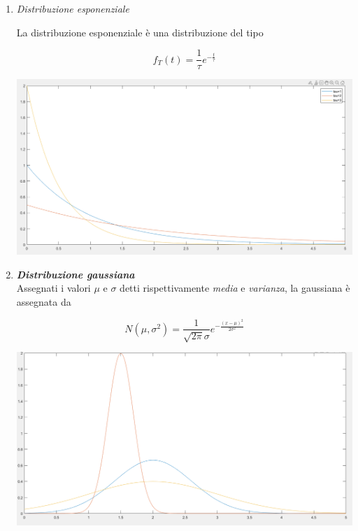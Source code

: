 \documentclass[]{article}
\begin{document}
\begin{enumerate}

\item \textit{Distribuzione esponenziale}

La distribuzione esponenziale è una distribuzione del tipo

\begin{equation}
f_T(t)=\frac{1}{\tau} e^{-\frac{t}{\tau}}
\end{equation}

\begin{center}
\includegraphics[scale=0.18]{distribuzione_esponenziale.png}
\end{center}

\item \textit{\textbf{Distribuzione gaussiana}}
\\
Assegnati i valori $\mu$ e $\sigma$ detti rispettivamente \textit{media} e \textit{varianza}, la gaussiana è assegnata da
     
\begin{equation}
N(\mu,\sigma^2)  = \frac{1}{\sqrt{2 \pi} \sigma} e^{- \frac{(x- \mu)^2}{2 \sigma^2}}
\end{equation}
\begin{center}
\includegraphics[scale=0.2]{gaussiane.png}


\end{center}
\end{enumerate}
\end{document}
